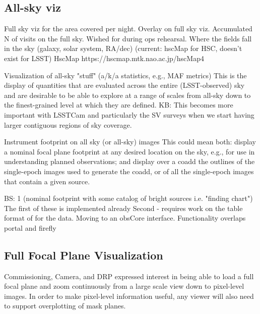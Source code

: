 
\subsection{All-sky viz}
 Full sky viz for the area covered per night.  Overlay on full sky viz. Accumulated N of visits on the full sky. Wished for during ops rehearsal.
Where the fields fall in the sky (galaxy, solar system, RA/dec)  (current: hscMap for HSC, doesn't  exist for LSST)
HscMap https://hscmap.mtk.nao.ac.jp/hscMap4

Visualization of all-sky "stuff" (a/k/a statistics, e.g., MAF metrics)
This is the display of quantities that are evaluated across the entire (LSST-observed) sky and are desirable to be able to explore at a range of scales from all-sky down to the finest-grained level at which they are defined.
KB: This becomes more important with LSSTCam and particularly the SV surveys when we start having larger contiguous regions of sky coverage.

Instrument footprint on all sky (or all-sky) images
This could mean both:
display a nominal focal plane footprint at any desired location on the sky, e.g., for use in understanding planned observations; and
display over a coadd the outlines of the single-epoch images used to generate the coadd, or of all the single-epoch images that contain a given source.

BS: 1 (nominal footprint with some catalog of bright sources i.e. "finding chart")
The first of these is implemented already
Second - requires work on the table format of for the data. Moving to an obsCore interface. Functionality overlaps portal and firefly



\subsection{Full Focal Plane Visualization}
\label{sec:large_viz}
Commissioning, Camera, and DRP expressed interest in being able to load a full focal plane and zoom continuously
from a large scale view down to pixel-level images.  In order to make pixel-level information useful, any
viewer will also need to support overplotting of mask planes.

